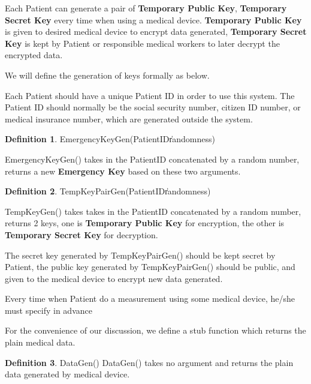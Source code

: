 \documentclass[]{scrartcl}
\theoremstyle{definition}
\newtheorem{definition}{Definition}[section]
\begin{document}
Each Patient can generate a pair of \textbf{Temporary Public Key}, \textbf{Temporary Secret Key} every time when using a medical device. \textbf{Temporary Public Key} is given to desired medical device to encrypt data generated, \textbf{Temporary Secret Key} is kept by Patient or responsible medical workers to later decrypt the encrypted data.

We will define the generation of keys formally as below.

Each Patient should have a unique Patient ID in order to use this system. The Patient ID should normally be the social security number, citizen ID number, or medical insurance number, which are generated outside the system.

\begin{definition}{EmergencyKeyGen(PatientID\|randomness)}

\newline
\newline

EmergencyKeyGen() takes in the PatientID concatenated by a random number, returns a new \textbf{Emergency Key} based on these two arguments.
\end{definition}


\begin{definition}{TempKeyPairGen(PatientID\|randomness)}
\newline

TempKeyGen() takes takes in the PatientID concatenated by a random number, returns 2 keys, one is \textbf{Temporary Public Key} for encryption, the other is \textbf{Temporary Secret Key} for decryption.
\end{definition}

The secret key generated by TempKeyPairGen() should be kept secret by Patient, the public key generated by TempKeyPairGen() should be public, and given to the medical device to encrypt new data generated. 

Every time when Patient do a measurement using some medical device, he/she must specify in advance 

For the convenience of our discussion, we define a stub function which returns the plain medical data.

\theoremstyle{definition}

\begin{definition}{DataGen()}
\newline
DataGen() takes no argument and returns the plain data generated by medical device.
\end{definition}
\end{document}
